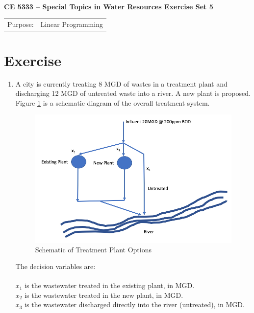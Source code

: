 \documentclass[12pt]{article}
\begin{document}
\begin{center}
{\textbf{{ CE 5333 -- Special Topics in Water Resources}  {Exercise Set 5}}}
\end{center}
\begingroup
\begin{tabular}{p{1in} p{5in}}
Purpose: & Linear Programming  \\
\end{tabular}
\endgroup
\section*{\small{Exercise}}
\begin{enumerate}
\item A city is currently treating 8 MGD of wastes in a treatment plant and discharging 12 MGD of untreated waste into a river. 
A new plant is proposed.  
Figure \ref{fig:TreatmentPlants} is a schematic diagram of the overall treatment system.

\begin{figure}[htbp] %
   \centering
   \includegraphics[width=6in]{TreatmentPlants.jpg} 
   \caption{Schematic of Treatment Plant Options}
   \label{fig:TreatmentPlants}
\end{figure}
The decision variables are:\\~\\
$x_1$ is the wastewater treated in the existing plant, in MGD.\\
$x_2$ is the wastewater treated in the new plant, in MGD. \\
$x_3$ is the wastewater discharged directly into the river (untreated), in MGD.\\


\end{enumerate}
\end{document}
